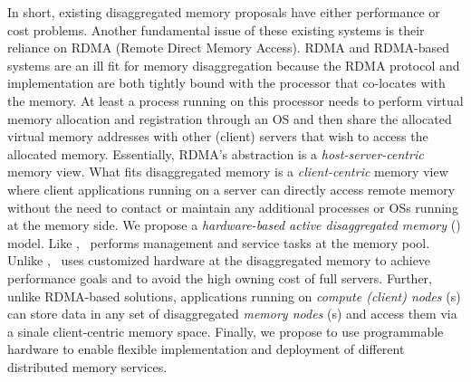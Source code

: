 In short, existing disaggregated memory proposals have either performance or cost problems.
Another fundamental issue of these existing systems is their reliance on RDMA (Remote Direct Memory Access).
RDMA and RDMA-based systems are an ill fit for memory disaggregation because the RDMA protocol and implementation are both tightly bound with the processor that co-locates with the memory.
At least a process running on this processor needs to perform virtual memory allocation 
and registration through an OS and then share the allocated virtual memory addresses
with other (client) servers that wish to access the allocated memory. 
Essentially, RDMA's abstraction is a {\em host-server-centric} memory view.
What fits disaggregated memory is a {\em client-centric} memory view 
where client applications running on a server can directly access remote memory without the need to contact or maintain 
any additional processes or OSs running at the memory side.
\fi
We propose a {\em hardware-based active disaggregated memory} ({\em \phdm}) model.
Like \sadm, %
\phdm\ performs management and service tasks at the memory pool.
Unlike \sadm, \phdm\ uses customized hardware at the disaggregated memory to achieve performance goals and to avoid the high owning cost of full servers.
Further, unlike RDMA-based solutions, applications running on {\em compute (client) 
nodes} ({\em \CN}s) can store data in any set of disaggregated {\em memory nodes}
({\em \MN}s) and access them via a sinale client-centric memory space.
Finally, we propose to use programmable hardware 
to enable flexible implementation and deployment of different distributed memory services.

